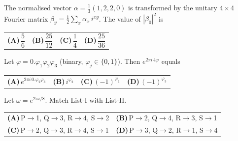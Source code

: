 \documentclass[11pt,a4paper]{article}
\newcommand{\optlabel}[1]{\textbf{(#1)}}
\newenvironment{qitem}[1]{\begin{list}{}{\setlength{\leftmargin}{3.3em}\setlength{\labelwidth}{3.1em}%
  \setlength{\labelsep}{0.2em}\setlength{\topsep}{3pt}\setlength{\parsep}{3pt}}\item[\textbf{Q.#1}\hfill]}{\end{list}}
\newcommand{\qsep}{\par\vspace{2pt}{\color{black!15}\hrule}\vspace{4pt}}
\begin{document}
\begin{qitem}{13}
The normalised vector $\alpha = \frac13(1, 2, 2, 0)$ is transformed by the unitary $4\times4$ Fourier matrix
$\beta_y = \frac12\sum_{x}\alpha_x\, i^{xy}$. The value of $|\beta_0|^2$ is
\par\smallskip\noindent\begin{tabularx}{\linewidth}{@{}*{4}{L}@{}}
\optlabel{A}\,$\dfrac56$ & \optlabel{B}\,$\dfrac{25}{12}$ & \optlabel{C}\,$\dfrac14$ & \optlabel{D}\,$\dfrac{25}{36}$
\end{tabularx}
\end{qitem}
\qsep

\begin{qitem}{14}
Let $\varphi = 0.\varphi_1\varphi_2\varphi_3$ (binary, $\varphi_j \in \{0,1\}$). Then $e^{2\pi i\,4\varphi}$ equals
\par\smallskip\noindent\begin{tabularx}{\linewidth}{@{}*{4}{L}@{}}
\optlabel{A}\,$e^{2\pi i\,0.\varphi_2\varphi_3}$ & \optlabel{B}\,$i^{\varphi_2}$ & \optlabel{C}\,$(-1)^{\varphi_1}$ & \optlabel{D}\,$(-1)^{\varphi_3}$
\end{tabularx}
\end{qitem}
\qsep

\begin{qitem}{15}
Let $\omega = e^{2\pi i/8}$. Match List-I with List-II.
\par\smallskip{}
\par\smallskip\noindent\begin{tabularx}{\linewidth}{@{}*{2}{L}@{}}
\optlabel{A}\,P$\to$1, Q$\to$3, R$\to$4, S$\to$2 & \optlabel{B}\,P$\to$2, Q$\to$4, R$\to$3, S$\to$1 \\[3pt]
\optlabel{C}\,P$\to$2, Q$\to$3, R$\to$4, S$\to$1 & \optlabel{D}\,P$\to$3, Q$\to$2, R$\to$1, S$\to$4
\end{tabularx}
\end{qitem}
\qsep
\end{document}
